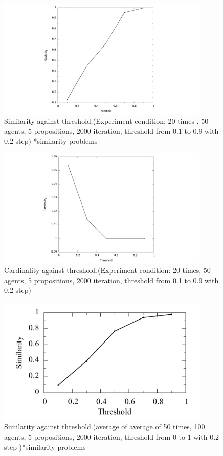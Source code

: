 \documentclass[a4paper,12pt]{article}
\begin{document}
\begin{figure}[H]
	\centering
	\includegraphics[width=0.9\textwidth]{yy}
	\caption{Similarity against threshold.(Experiment condition: 20 times , 50 agents, 5 propositions, 2000 iteration, threshold from 0.1 to 0.9 with 0.2 step) *similarity problems }\label{thre_sim_minhamm}
\end{figure}
%
\begin{figure}[H]
	\centering
	\includegraphics[width=0.9\textwidth]{cardminhamm}
	\caption{Cardinality against threshold.(Experiment condition: 20 times, 50 agents, 5 propositions, 2000 iteration, threshold from 0.1 to 0.9 with 0.2 step)}\label{thre_card_minhamm}
\end{figure}
%
\begin{figure}[H]
	\centering
    \includegraphics[width=0.9\textwidth]{simi_hammin_100a}
	\caption{Similarity against threshold.(average of average of 50 times, 100 agents, 5 propositions, 2000 iteration, threshold from 0 to 1 with 0.2 step )*similarity problems }
\end{figure}
\end{document}
